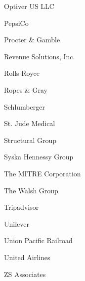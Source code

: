 \documentclass[twoside]{article}
\begin{document}
\begin{center}
\begin{multicols}{5}
\begin{FlushLeft}
\begin{compactitem}
\item Optiver US LLC
\item PepsiCo
\item Procter \& Gamble
\item Revenue Solutions, Inc.
\item Rolls-Royce
\item Ropes \& Gray
\item Schlumberger
\item St. Jude Medical
\item Structural Group
\item Syska Hennessy Group
\item The MITRE Corporation
\item The Walsh Group
\item Tripadvisor
\item Unilever
\item Union Pacific Railroad
\item United Airlines
\item ZS Associates
\end{compactitem}
        \end{FlushLeft}
        \vspace{1em}
        \end{multicols}\end{center}
    \newpage
    \startcompanysection
    \startsponsorsection{}
\end{document}

